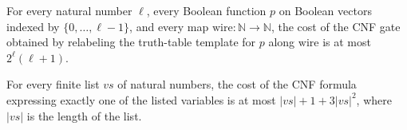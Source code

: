 \begin{theorem}
\label{Complexity.FormulaKit.gate_cost_le}
\leanok
{}
For every natural number $\ell$, every Boolean function $p$ on Boolean vectors indexed
by $\{0,\ldots,\ell-1\}$, and every map $\mathrm{wire}:\mathbb{N}\to\mathbb{N}$, the
cost of the CNF gate obtained by relabeling the truth-table template for $p$ along
$\mathrm{wire}$ is at most $2^\ell(\ell+1)$.
\end{theorem}

\begin{theorem}
\label{Complexity.FormulaKit.exactlyOne_cost_le}
\leanok
{}
For every finite list $vs$ of natural numbers, the cost of the CNF formula expressing
exactly one of the listed variables is at most $|vs|+1+3|vs|^2$, where $|vs|$ is the
length of the list.
\end{theorem}
